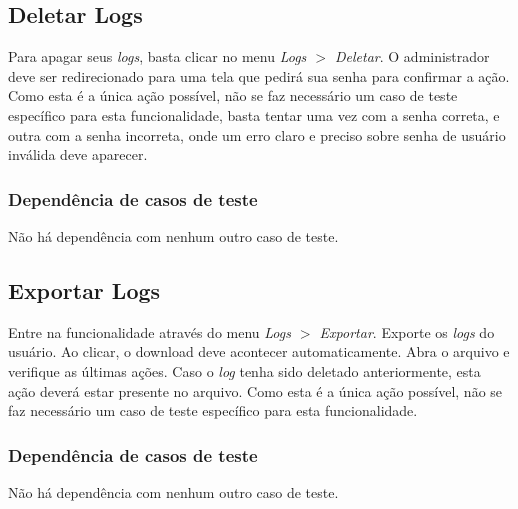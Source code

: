 \subsection{Deletar Logs}

Para apagar seus \textit{logs}, basta clicar no menu \textit{Logs $>$ Deletar}. O administrador deve ser redirecionado para uma tela que pedirá sua senha para confirmar a ação.  Como esta é a única ação possível, não se faz necessário um  caso de teste específico para esta funcionalidade, basta tentar uma vez com a senha correta, e outra com a senha incorreta, onde um erro claro e preciso sobre senha de usuário inválida deve aparecer.

\subsubsection{Dependência de casos de teste}
Não há dependência com nenhum outro caso de teste.

\subsection{Exportar Logs}

Entre na funcionalidade através do menu \textit{Logs $>$ Exportar}. Exporte os \textit{logs} do usuário. Ao clicar, o download deve acontecer automaticamente. Abra o arquivo e verifique as últimas ações. Caso o \textit{log} tenha sido deletado anteriormente, esta ação deverá estar presente no arquivo. Como esta é a única ação possível, não se faz necessário um  caso de teste específico para esta funcionalidade.

\subsubsection{Dependência de casos de teste}
Não há dependência com nenhum outro caso de teste.